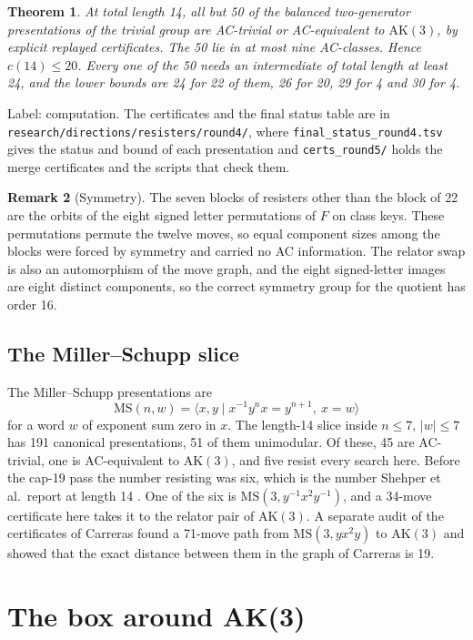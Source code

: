 \documentclass[11pt,a4paper]{article}
\newtheorem{theorem}{Theorem}[section]
\theoremstyle{definition}
\newtheorem{remark}[theorem]{Remark}
\newcommand{\AK}{\mathrm{AK}}
\newcommand{\MS}{\mathrm{MS}}
\newcommand{\Fr}{F}
\newcommand{\inv}[1]{#1^{-1}}
\begin{document}
\begin{theorem}\label{thm:c14}
At total length 14, all but 50 of the balanced two-generator presentations of the trivial group are AC-trivial or AC-equivalent to $\AK(3)$, by explicit replayed certificates. The 50 lie in at most nine AC-classes. Hence $c(14)\le 20$. Every one of the 50 needs an intermediate of total length at least 24, and the lower bounds are 24 for 22 of them, 26 for 20, 29 for 4 and 30 for 4.
\end{theorem}

Label: computation. The certificates and the final status table are in \texttt{research/directions/resisters/round4/}, where \texttt{final\_status\_round4.tsv} gives the status and bound of each presentation and \texttt{certs\_round5/} holds the merge certificates and the scripts that check them.

\begin{remark}[Symmetry]
The seven blocks of resisters other than the block of 22 are the orbits of the eight signed letter permutations of $\Fr$ on class keys. These permutations permute the twelve moves, so equal component sizes among the blocks were forced by symmetry and carried no AC information. The relator swap is also an automorphism of the move graph, and the eight signed-letter images are eight distinct components, so the correct symmetry group for the quotient has order 16.
\end{remark}

\subsection{The Miller--Schupp slice}

The Miller--Schupp presentations \cite{MS99} are
\[
\MS(n,w) = \langle x,y \mid \inv{x}y^n x = y^{n+1},\ x = w\rangle
\]
for a word $w$ of exponent sum zero in $x$. The length-14 slice inside $n\le7$, $|w|\le7$ has 191 canonical presentations, 51 of them unimodular. Of these, 45 are AC-trivial, one is AC-equivalent to $\AK(3)$, and five resist every search here. Before the cap-19 pass the number resisting was six, which is the number Shehper et al.\ report at length 14 \cite{SMF25}. One of the six is $\MS(3,\inv{y}x^2\inv{y})$, and a 34-move certificate here takes it to the relator pair of $\AK(3)$. A separate audit of the certificates of Carreras \cite{Car26} found a 71-move path from $\MS(3,yx^2y)$ to $\AK(3)$ and showed that the exact distance between them in the graph of Carreras is 19.

\section{The box around AK(3)}\label{sec:box}
\end{document}
